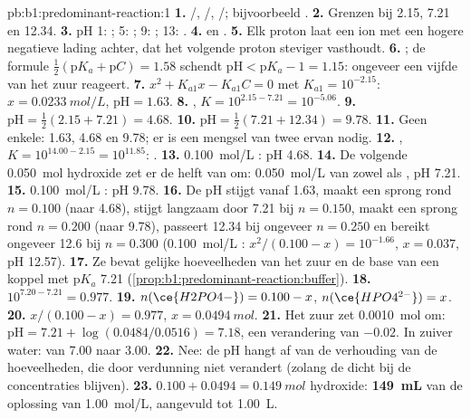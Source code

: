\begin{solution}{pb:b1:predominant-reaction:1}
\textbf{1.} /, /,
/; bijvoorbeeld .
\textbf{2.} Grenzen bij 2.15, 7.21 en 12.34.
\textbf{3.} pH 1: ; 5: ; 9: ; 13:
.
\textbf{4.}  en .
\textbf{5.} Elk proton laat een ion met een hogere negatieve lading
achter, dat het volgende proton steviger vasthoudt.
\textbf{6.} ; de formule
$\frac12(\mathrm{p}K_a + \mathrm{p}C) = 1.58$ schendt $\mathrm{pH} <
\mathrm{p}K_a - 1 = 1.15$: ongeveer een vijfde van het zuur reageert.
\textbf{7.} $x^2 + K_{a1}x - K_{a1}C = 0$ met $K_{a1} = 10^{-2.15}$: $x =
\qty{0.0233}{mol/L}$, $\mathrm{pH} = 1.63$.
\textbf{8.} , $K = 10^{2.15 - 7.21} =
10^{-5.06}$.
\textbf{9.} $\mathrm{pH} = \frac12(2.15 + 7.21) = 4.68$.
\textbf{10.} $\mathrm{pH} = \frac12(7.21 + 12.34) = 9.78$.
\textbf{11.} Geen enkele: 1.63, 4.68 en 9.78; er is een mengsel van twee
ervan nodig.
\textbf{12.} , $K = 10^{14.00 - 2.15} =
10^{11.85}$: .
\textbf{13.} \qty{0.100}{mol/L} : pH 4.68.
\textbf{14.} De volgende \qty{0.050}{mol} hydroxide zet er de helft van
om: \qty{0.050}{mol/L} van zowel  als , pH 7.21.
\textbf{15.} \qty{0.100}{mol/L} : pH 9.78.
\textbf{16.} De pH stijgt vanaf 1.63, maakt een sprong rond $n = 0.100$
(naar 4.68), stijgt langzaam door 7.21 bij $n = 0.150$, maakt een sprong
rond $n = 0.200$ (naar 9.78), passeert 12.34 bij ongeveer $n = 0.250$ en
bereikt ongeveer 12.6 bij $n = 0.300$ (\qty{0.100}{mol/L} :
$x^2/(0.100 - x) = 10^{-1.66}$, $x = 0.037$, pH 12.57).
\textbf{17.} Ze bevat gelijke hoeveelheden van het zuur en de base van een
koppel met $\mathrm{p}K_a$ 7.21 (\cref{prop:b1:predominant-reaction:buffer}).
\textbf{18.} $10^{7.20 - 7.21} = 0.977$.
\textbf{19.} $n(\ce{H2PO4-}) = 0.100 - x$, $n(\ce{HPO4^{2-}}) = x$.
\textbf{20.} $x/(0.100 - x) = 0.977$, $x = \qty{0.0494}{mol}$.
\textbf{21.} Het zuur zet \qty{0.0010}{mol}  om:
$\mathrm{pH} = 7.21 + \log(0.0484/0.0516) = 7.18$, een verandering van
$-0.02$. In zuiver water: van 7.00 naar 3.00.
\textbf{22.} Nee: de pH hangt af van de verhouding van de hoeveelheden,
die door verdunning niet verandert (zolang de  dicht bij de
concentraties blijven).
\textbf{23.} $0.100 + 0.0494 = \qty{0.149}{mol}$ hydroxide:
\textbf{\qty{149}{mL}} van de oplossing van \qty{1.00}{mol/L}, aangevuld
tot \qty{1.00}{L}.
\end{solution}
